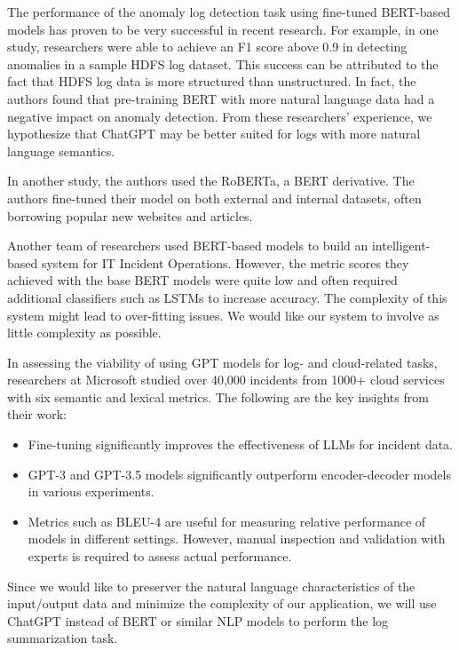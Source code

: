 \documentclass[conference]{IEEEtran}
\begin{document}
The performance of the anomaly log detection task using fine-tuned BERT-based models has proven to be very successful in recent research. For example, in one study, researchers were able to achieve an F1 score above 0.9 in detecting anomalies in a sample HDFS log dataset. This success can be attributed to the fact that HDFS log data is more structured than unstructured. In fact, the authors found that pre-training BERT with more natural language data had a negative impact on anomaly detection. \cite{LEE2023110689} From these researchers' experience, we hypothesize that ChatGPT may be better suited for logs with more natural language semantics.

In another study, the authors used the RoBERTa, a BERT derivative. The authors fine-tuned their model on both external and internal datasets, often borrowing popular new websites and articles. \cite{saha2022mining}

Another team of researchers used BERT-based models to build an intelligent-based system for IT Incident Operations. However, the metric scores they achieved with the base BERT models were quite low and often required additional classifiers such as LSTMs to increase accuracy. The complexity of this system might lead to over-fitting issues. \cite{10189040} We would like our system to involve as little complexity as possible.

In assessing the viability of using GPT models for log- and cloud-related tasks, researchers at Microsoft studied over 40,000 incidents from 1000+ cloud services with six semantic and lexical metrics.\cite{10172904}  The following are the key insights from their work:
\begin{itemize}
    \item Fine-tuning significantly improves the effectiveness of LLMs for incident data.
    \item GPT-3 and GPT-3.5 models significantly outperform encoder-decoder models in various experiments.
    \item Metrics such as BLEU-4 are useful for measuring relative performance of models in different settings. However, manual inspection and validation with experts is required to assess actual performance.
\end{itemize}

Since we would like to preserver the natural language characteristics of the input/output data and minimize the complexity of our application, we will use ChatGPT instead of BERT or similar NLP models to perform the log summarization task. 
\end{document}
